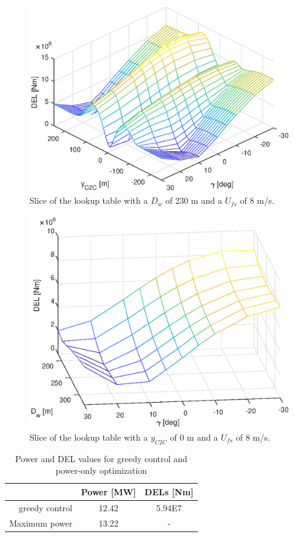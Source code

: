 \begin{figure}
	\includegraphics[width=\linewidth]{./Figures/LUTslice_Dw230_Ufs8.eps}
	\caption{Slice of the lookup table with a $D_{w}$ of 230 m and a $U_{fs}$ of 8 m/s. }
	\label{fig:LUTsliceC2C}
\end{figure}

\begin{figure}
	\includegraphics[width=\linewidth]{./Figures/LUTslice_yWake0_Ufs8.eps}
	\caption{Slice of the lookup table with a $y_{C2C}$ of 0 m and a $U_{fs}$ of 8 m/s. }
	\label{fig:LUTsliceDw}
\end{figure}

\begin{table}[t]
	\caption{Power and DEL values for greedy control and power-only optimization}
	\centering
	\label{tab:reference results}
	\begin{tabular}{rcc}
		\hline
		& Power [MW] & DELs [Nm] \\ 
		\hline
		greedy control & 12.42 & 5.94E7 \\
		Maximum power & 13.22 & - \\
		\hline
	\end{tabular}
\end{table}

